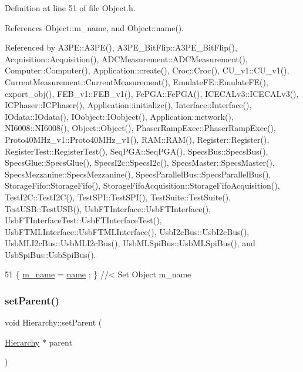 Definition at line 51 of file Object.\+h.



References Object\+::m\+\_\+name, and Object\+::name().



Referenced by A3\+P\+E\+::\+A3\+P\+E(), A3\+P\+E\+\_\+\+Bit\+Flip\+::\+A3\+P\+E\+\_\+\+Bit\+Flip(), Acquisition\+::\+Acquisition(), A\+D\+C\+Measurement\+::\+A\+D\+C\+Measurement(), Computer\+::\+Computer(), Application\+::create(), Croc\+::\+Croc(), C\+U\+\_\+v1\+::\+C\+U\+\_\+v1(), Current\+Measurement\+::\+Current\+Measurement(), Emulate\+F\+E\+::\+Emulate\+F\+E(), export\+\_\+obj(), F\+E\+B\+\_\+v1\+::\+F\+E\+B\+\_\+v1(), Fe\+P\+G\+A\+::\+Fe\+P\+G\+A(), I\+C\+E\+C\+A\+Lv3\+::\+I\+C\+E\+C\+A\+Lv3(), I\+C\+Phaser\+::\+I\+C\+Phaser(), Application\+::initialize(), Interface\+::\+Interface(), I\+Odata\+::\+I\+Odata(), I\+Oobject\+::\+I\+Oobject(), Application\+::network(), N\+I6008\+::\+N\+I6008(), Object\+::\+Object(), Phaser\+Ramp\+Exec\+::\+Phaser\+Ramp\+Exec(), Proto40\+M\+Hz\+\_\+v1\+::\+Proto40\+M\+Hz\+\_\+v1(), R\+A\+M\+::\+R\+A\+M(), Register\+::\+Register(), Register\+Test\+::\+Register\+Test(), Seq\+P\+G\+A\+::\+Seq\+P\+G\+A(), Specs\+Bus\+::\+Specs\+Bus(), Specs\+Glue\+::\+Specs\+Glue(), Specs\+I2c\+::\+Specs\+I2c(), Specs\+Master\+::\+Specs\+Master(), Specs\+Mezzanine\+::\+Specs\+Mezzanine(), Specs\+Parallel\+Bus\+::\+Specs\+Parallel\+Bus(), Storage\+Fifo\+::\+Storage\+Fifo(), Storage\+Fifo\+Acquisition\+::\+Storage\+Fifo\+Acquisition(), Test\+I2\+C\+::\+Test\+I2\+C(), Test\+S\+P\+I\+::\+Test\+S\+P\+I(), Test\+Suite\+::\+Test\+Suite(), Test\+U\+S\+B\+::\+Test\+U\+S\+B(), Usb\+F\+T\+Interface\+::\+Usb\+F\+T\+Interface(), Usb\+F\+T\+Interface\+Test\+::\+Usb\+F\+T\+Interface\+Test(), Usb\+F\+T\+M\+L\+Interface\+::\+Usb\+F\+T\+M\+L\+Interface(), Usb\+I2c\+Bus\+::\+Usb\+I2c\+Bus(), Usb\+M\+L\+I2c\+Bus\+::\+Usb\+M\+L\+I2c\+Bus(), Usb\+M\+L\+Spi\+Bus\+::\+Usb\+M\+L\+Spi\+Bus(), and Usb\+Spi\+Bus\+::\+Usb\+Spi\+Bus().


\begin{DoxyCode}
51 \{ \hyperlink{classObject_a8b83c95c705d2c3ba0d081fe1710f48d}{m\_name}  = \hyperlink{classObject_a300f4c05dd468c7bb8b3c968868443c1}{name}  ; \} \textcolor{comment}{//< Set Object m\_name}
\end{DoxyCode}
\mbox{\label{classHierarchy_a585ad1aeec16077a0e532ab8b4fc557b}} 
\subsubsection{\texorpdfstring{set\+Parent()}{setParent()}}
{\footnotesize\ttfamily void Hierarchy\+::set\+Parent (\begin{DoxyParamCaption}\item[{\hyperlink{classHierarchy}{Hierarchy} $\ast$}]{parent }\end{DoxyParamCaption})}



